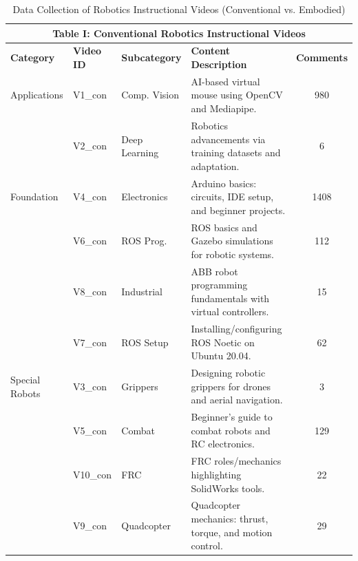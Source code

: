 \documentclass[12pt]{article}
\begin{document}
\begin{table}[!t]
    \centering
    \scriptsize %
    \caption{Data Collection of Robotics Instructional Videos (Conventional vs. Embodied)}
    \label{tab:combined_robotics}
    
    \begin{tabularx}{\textwidth}{l l p{2.2cm} X c} 
        \toprule
        \multicolumn{5}{c}{\textbf{Table I: Conventional Robotics Instructional Videos}} \\
        \midrule
        \textbf{Category} & \textbf{Video ID} & \textbf{Subcategory} & \textbf{Content Description} & \textbf{Comments} \\
        \midrule
        Applications & V1\_con & Comp. Vision & AI-based virtual mouse using OpenCV and Mediapipe. & 980 \\
        & V2\_con & Deep Learning & Robotics advancements via training datasets and adaptation. & 6 \\
        \addlinespace
        Foundation & V4\_con & Electronics & Arduino basics: circuits, IDE setup, and beginner projects. & 1408 \\
        & V6\_con & ROS Prog. & ROS basics and Gazebo simulations for robotic systems. & 112 \\
        & V8\_con & Industrial & ABB robot programming fundamentals with virtual controllers. & 15 \\
        & V7\_con & ROS Setup & Installing/configuring ROS Noetic on Ubuntu 20.04. & 62 \\
        \addlinespace
        Special Robots & V3\_con & Grippers & Designing robotic grippers for drones and aerial navigation. & 3 \\
        & V5\_con & Combat & Beginner's guide to combat robots and RC electronics. & 129 \\
        & V10\_con & FRC & FRC roles/mechanics highlighting SolidWorks tools. & 22 \\
        & V9\_con & Quadcopter & Quadcopter mechanics: thrust, torque, and motion control. & 29 \\
        \bottomrule
    \end{tabularx}

    \vspace{2.5em} %


\end{table}
\end{document}
